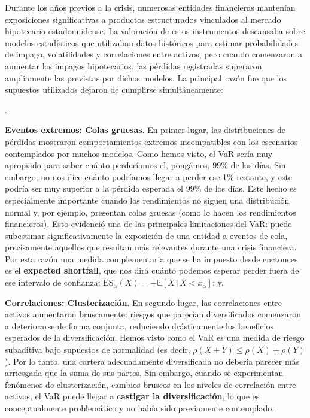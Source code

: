 \documentclass[10pt,a4paper]{article}
\newcounter{numitem}
\newenvironment{lnum}
      {\begin{list}{\arabic{numitem}.}{%
          \usecounter{numitem}%
          \setlength{\leftmargin}{1cm}%
          \setlength{\parskip}{3pt}%
          \setlength{\itemsep}{0pt}%
          \setlength{\parsep}{0pt}%
      }}
      {\end{list}}
\begin{document}
Durante los años previos a la crisis, numerosas entidades financieras mantenían exposiciones significativas a productos estructurados vinculados al mercado hipotecario estadounidense. La valoración de estos instrumentos descansaba sobre modelos estadísticos que utilizaban datos históricos para estimar probabilidades de impago, volatilidades y correlaciones entre activos, pero cuando comenzaron a aumentar los impagos hipotecarios, las pérdidas registradas superaron ampliamente las previstas por dichos modelos. La principal razón fue que los supuestos utilizados dejaron de cumplirse simultáneamente:
\begin{lnum}
    \item \textbf{Eventos extremos: Colas gruesas}. En primer lugar, las distribuciones de pérdidas mostraron comportamientos extremos incompatibles con los escenarios contemplados por muchos modelos. Como hemos visto, el VaR sería muy apropiado para saber cuánto perderíamos el, pongámos, 99\% de los días. Sin embargo, no nos dice cuánto podríamos llegar a perder ese 1\% restante, y este podría ser muy superior a la pérdida esperada el 99\% de los días. Este hecho es especialmente importante cuando los rendimientos no siguen una distribución normal y, por ejemplo, presentan colas gruesas (como lo hacen los rendimientos financieros). Esto evidenció una de las principales limitaciones del VaR: puede subestimar significativamente la exposición de una entidad a eventos de cola, precisamente aquellos que resultan más relevantes durante una crisis financiera. Por esta razón una medida complementaria que se ha impuesto desde enctonces es el \textbf{expected shortfall}, que nos dirá cuánto podemos esperar perder fuera de ese intervalo de confianza: ${\text{ES}_{\alpha }(X)=-\mathbb E[X\,|\,X<x_{\alpha }]}$; y,
    \item \textbf{Correlaciones: Clusterización}. En segundo lugar, las correlaciones entre activos aumentaron bruscamente: riesgos que parecían diversificados comenzaron a deteriorarse de forma conjunta, reduciendo drásticamente los beneficios esperados de la diversificación. Hemos visto como el VaR es una medida de riesgo subaditiva bajo supuestos de normalidad (es decir, $\rho(X+Y)\leq \rho(X)+\rho(Y)$). Por lo tanto, una cartera adecuadamente diversificada no debería parecer más arriesgada que la suma de sus partes. Sin embargo, cuando se experimentan fenómenos de clusterización, cambios bruscos en los niveles de correlación entre activos, el VaR puede llegar a \textbf{castigar la diversificación}, lo que es conceptualmente problemático y no había sido previamente contemplado.
\end{lnum}
\end{document}
